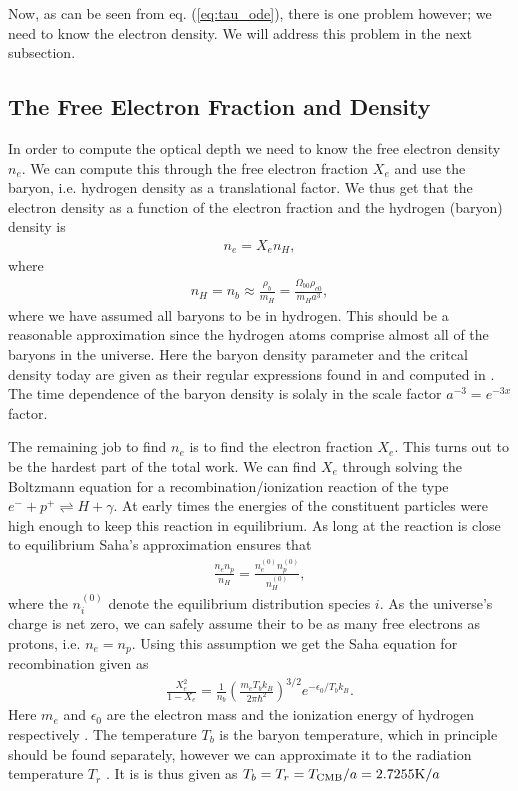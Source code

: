 \documentclass[twocolumn]{aastex62}
\begin{document}
Now, as can be seen from eq. (\ref{eq:tau_ode}), there is one problem however; we need to know the electron density. We will address this problem in the next subsection.

\subsection{The Free Electron Fraction and Density}
In order to compute the optical depth we need to know the free electron density $n_e$. We can compute this through the free electron fraction $X_e$ and use the baryon, i.e. hydrogen density as a translational factor. We thus get that the electron density as a function of the electron fraction and the hydrogen (baryon) density is 
\begin{align}
    n_e = X_e n_H,
\end{align}
where 
\begin{align}
    n_H = n_b \approx \frac{\rho_b}{m_H} = \frac{\Omega_{b0} \rho_{c0}}{m_H a^3},
\end{align}
where we have assumed all baryons to be in hydrogen. This should be a reasonable approximation since the hydrogen atoms comprise almost all of the baryons in the universe. Here the baryon density parameter and the critcal density today are given as their regular expressions found in and computed in \cite{stutzer:2020}. The time dependence of the baryon density is solaly in the scale factor $a^{-3} = e^{-3x}$ factor. 

The remaining job to find $n_e$ is to find the electron fraction $X_e$. This turns out to be the hardest part of the total work. We can find $X_e$ through solving the Boltzmann equation for a recombination/ionization reaction of the type $e^{-} + p^{+} \rightleftharpoons H + \gamma$. At early times the energies of the constituent particles were high enough to keep this reaction in equilibrium. As long at the reaction is close to equilibrium Saha's approximation \citep[p. 70]{dodelson:2003} ensures that 
\begin{align}
    \frac{n_e n_p}{n_H} = \frac{n_e^{(0)}n_p^{(0)}}{n_H^{(0)}},
\end{align}
where the $n_i^{(0)}$ denote the equilibrium distribution species $i$. As the universe's charge is net zero, we can safely assume their to be as many free electrons as protons, i.e. $n_e = n_p$. Using this assumption we get the Saha equation for recombination given as 
\begin{align}
    \frac{X_e^2}{1 - X_e} = \frac{1}{n_b} \left(\frac{m_e
    T_bk_B}{2\pi\hbar^2}\right)^{3/2} e^{-\epsilon_0/T_bk_B}.
\end{align}
Here $m_e$ and $\epsilon_0$ are the electron mass and the ionization energy of hydrogen respectively \citep[]{winther:2020}. The temperature $T_b$ is the baryon temperature, which in principle should be found separately, however we can approximate it to the radiation temperature $T_r$ \citep[]{winther:2020}. It is is thus given as $T_b =
T_r = T_{\rm CMB} / a = 2.7255 \textrm{K} / a$ 
\end{document}
